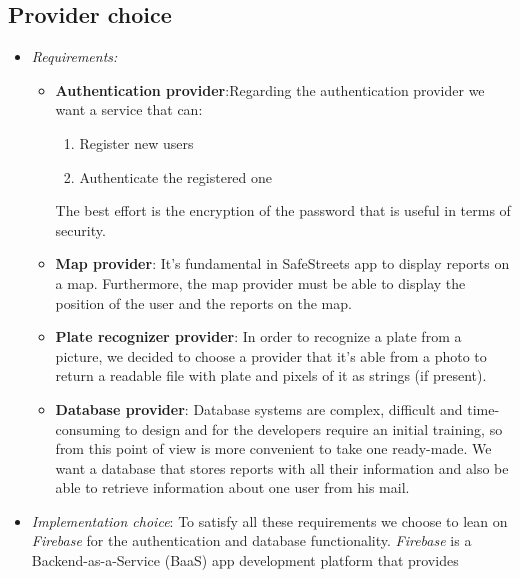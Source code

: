 \documentclass[../RASD.tex]{subfiles}
\begin{document}
    \subsection{Provider choice}\label{subsec:provider-choice}
    \begin{itemize}
        \item \textit{Requirements:}
        \begin{itemize}
             \item \textbf{Authentication provider}:\newline Regarding the authentication provider we want a service that can:
             \begin{enumerate}
                 \item Register new users
                 \item Authenticate the registered one
             \end{enumerate}
             The best effort is the encryption of the password that is useful in terms of security.
             \item \textbf{Map provider}: \newline It’s fundamental in SafeStreets app to display reports on a map.
             Furthermore, the map provider must be able to display the position of the user and the reports on the map.
             \item \textbf{Plate recognizer provider}: \newline In order to recognize a plate from a picture, we decided to choose a provider
             that it’s able from a photo to return a readable file with plate and pixels of it as strings (if present).
             \item \textbf{Database provider}: \newline Database systems are complex, difficult and time-consuming to design and for the developers require
             an initial training, so from this point of view is more convenient to take one ready-made.
             We want a database that stores reports with all their information and also be able to retrieve information about one user from his mail.
        \end{itemize}
        \item \textit{Implementation choice}: \newline To satisfy all these requirements we choose to lean on \textit{Firebase}
        for the authentication and database functionality. \textit{Firebase} is a Backend-as-a-Service (BaaS) app development platform that provides

\end{itemize}
\end{document}
